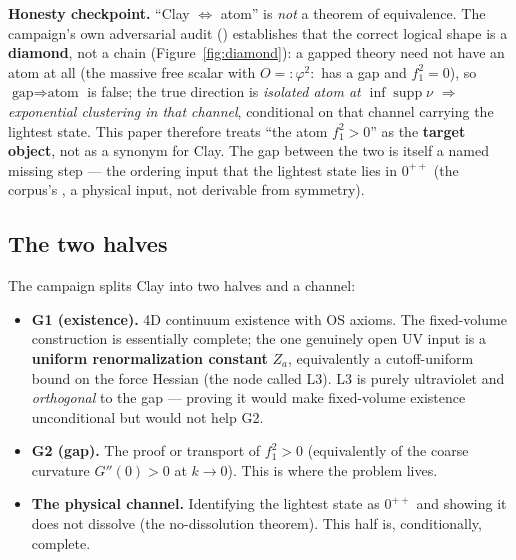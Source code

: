 \textbf{Honesty checkpoint.} ``Clay $\iff$ atom'' is \emph{not} a theorem of equivalence. The
campaign's own adversarial audit () establishes
that the correct logical shape is a \textbf{diamond}, not a chain (Figure~\ref{fig:diamond}): a
gapped theory need not have an atom at all (the massive free scalar with $O={:}\varphi^2{:}$
has a gap and $f_1^2=0$), so $\text{gap}\Rightarrow\text{atom}$ is false; the true direction is
\emph{isolated atom at $\inf\operatorname{supp}\nu$ $\Rightarrow$ exponential clustering in that
channel}, conditional on that channel carrying the lightest state. This paper therefore treats
``the atom $f_1^2>0$'' as the \textbf{target object}, not as a synonym for Clay. The gap
between the two is itself a named missing step --- the ordering input that the lightest state
lies in $0^{++}$ (the corpus's , a physical input, not derivable from symmetry).

\figreduction

\subsection{The two halves}

The campaign splits Clay into two halves and a channel:

\begin{itemize}
\item \textbf{G1 (existence).} 4D continuum existence with OS axioms. The fixed-volume
  construction is essentially complete; the one genuinely open UV input is a \textbf{uniform
  renormalization constant} $Z_a$, equivalently a cutoff-uniform bound on the force Hessian
  (the node called L3). L3 is purely ultraviolet and \emph{orthogonal} to the gap --- proving it
  would make fixed-volume existence unconditional but would not help G2.
\item \textbf{G2 (gap).} The proof or transport of $f_1^2>0$ (equivalently of the coarse
  curvature $G''(0)>0$ at $k\to0$). This is where the problem lives.
\item \textbf{The physical channel.} Identifying the lightest state as $0^{++}$ and showing it
  does not dissolve (the no-dissolution theorem). This half is, conditionally, complete.
\end{itemize}

